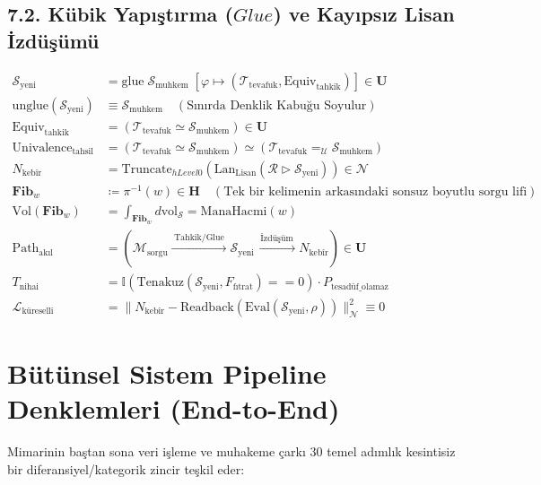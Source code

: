 \documentclass[11pt, a4paper]{article}
\begin{document}
\subsection{7.2. Kübik Yapıştırma ($Glue$) ve Kayıpsız Lisan İzdüşümü}
\begin{align}
\mathcal{S}_{\text{yeni}} &= \text{glue} \; \mathcal{S}_{\text{muhkem}} \; \left[ \varphi \mapsto (\mathcal{T}_{\text{tevafuk}}, \text{Equiv}_{\text{tahkik}}) \right] \in \mathbf{U} \\
\text{unglue}(\mathcal{S}_{\text{yeni}}) &\equiv \mathcal{S}_{\text{muhkem}} \quad (\text{Sınırda Denklik Kabuğu Soyulur}) \\
\text{Equiv}_{\text{tahkik}} &= (\mathcal{T}_{\text{tevafuk}} \simeq \mathcal{S}_{\text{muhkem}}) \in \mathbf{U} \\
\text{Univalence}_{\text{tahsil}} &= (\mathcal{T}_{\text{tevafuk}} \simeq \mathcal{S}_{\text{muhkem}}) \simeq (\mathcal{T}_{\text{tevafuk}} =_{\mathcal{U}} \mathcal{S}_{\text{muhkem}}) \\
N_{\text{kebîr}} &= \text{Truncate}_{hLevel 0}\left( \text{Lan}_{\text{Lisan}} \left( \mathcal{R} \triangleright \mathcal{S}_{\text{yeni}} \right) \right) \in \mathcal{N} \\
\mathbf{Fib}_w &\coloneqq \pi^{-1}(w) \in \mathbf{H} \quad (\text{Tek bir kelimenin arkasındaki sonsuz boyutlu sorgu lifi}) \\
\text{Vol}(\mathbf{Fib}_w) &= \int_{\mathbf{Fib}_w} d\text{vol}_{\mathcal{S}} = \text{ManaHacmi}(w) \\
\text{Path}_{\text{akıl}} &= \left( \mathcal{M}_{\text{sorgu}} \xrightarrow{\;\text{Tahkik/Glue}\;} \mathcal{S}_{\text{yeni}} \xrightarrow{\;\text{İzdüşüm}\;} N_{\text{kebîr}} \right) \in \mathbf{U} \\
T_{\text{nihai}} &= \mathbb{I}\left( \text{Tenakuz}(\mathcal{S}_{\text{yeni}}, F_{\text{fıtrat}}) == 0 \right) \cdot P_{\text{tesadüf\_olamaz}} \\
\mathcal{L}_{\text{küreselli}} &= \| N_{\text{kebîr}} - \text{Readback}(\text{Eval}(\mathcal{S}_{\text{yeni}}, \rho)) \|_{\mathcal{N}}^2 \equiv 0
\end{align}

\section{Bütünsel Sistem Pipeline Denklemleri (End-to-End)}

Mimarinin baştan sona veri işleme ve muhakeme çarkı 30 temel adımlık kesintisiz bir diferansiyel/kategorik zincir teşkil eder:
\end{document}
